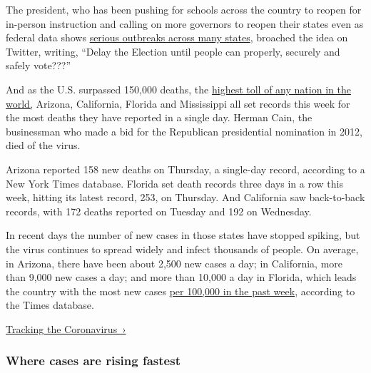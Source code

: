 The president, who has been pushing for schools across the country to
reopen for in-person instruction and calling on more governors to reopen
their states even as federal data shows
\href{https://www.nytimes3xbfgragh.onion/interactive/2020/07/28/us/states-report-virus-response-july-26.html}{serious
outbreaks across many states}, broached the idea on Twitter, writing,
``Delay the Election until people can properly, securely and safely
vote???''

And as the U.S. surpassed 150,000 deaths, the
\href{https://www.nytimes3xbfgragh.onion/interactive/2020/world/coronavirus-maps.html}{highest
toll of any nation in the world,} Arizona, California, Florida and
Mississippi all set records this week for the most deaths they have
reported in a single day. Herman Cain, the businessman who made a bid
for the Republican presidential nomination in 2012, died of the virus.

Arizona reported 158 new deaths on Thursday, a single-day record,
according to a New York Times database. Florida set death records three
days in a row this week, hitting its latest record, 253, on Thursday.
And California saw back-to-back records, with 172 deaths reported on
Tuesday and 192 on Wednesday.

In recent days the number of new cases in those states have stopped
spiking, but the virus continues to spread widely and infect thousands
of people. On average, in Arizona, there have been about 2,500 new cases
a day; in California, more than 9,000 new cases a day; and more than
10,000 a day in Florida, which leads the country with the most new cases
\href{https://www.nytimes3xbfgragh.onion/interactive/2020/us/coronavirus-us-cases.html}{per
100,000 in the past week}, according to the Times database.

\href{https://www.nytimes3xbfgragh.onion/interactive/2020/us/coronavirus-us-cases.html}{Tracking
the Coronavirus~›}

\href{https://www.nytimes3xbfgragh.onion/interactive/2020/us/coronavirus-us-cases.html}{}

\hypertarget{where-cases-are-rising-fastest}{%
\subsubsection{\texorpdfstring{Where cases are \textbf{rising}
fastest}{Where cases are rising fastest}}\label{where-cases-are-rising-fastest}}

\href{https://www.nytimes3xbfgragh.onion/interactive/2020/us/hawaii-coronavirus-cases.html}{}

